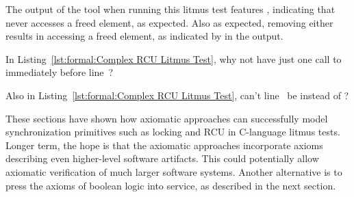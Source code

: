 \begin{lineref}
The output of the  tool when running this litmus test features
, indicating that  never accesses a freed element,
as expected.
Also as expected, removing either  results
in  accessing a freed element, as indicated by 
in the  output.
\end{lineref}

\QuickQuiz{}
	\begin{lineref}
	In Listing~\ref{lst:formal:Complex RCU Litmus Test},
	why not have just one call to 
	immediately before line~?
	\end{lineref}
 \QuickQuizEnd

\QuickQuiz{}
	\begin{lineref}
	Also in Listing~\ref{lst:formal:Complex RCU Litmus Test},
	can't line~ be  instead
	of ?
	\end{lineref}
 \QuickQuizEnd

These sections have shown how axiomatic approaches can successfully
model synchronization primitives such as locking and RCU in C-language
litmus tests.
Longer term, the hope is that the axiomatic approaches incorporate
axioms describing even higher-level software artifacts.
This could potentially allow axiomatic verification of much larger
software systems.
Another alternative is to press the axioms of boolean logic into service,
as described in the next section.
